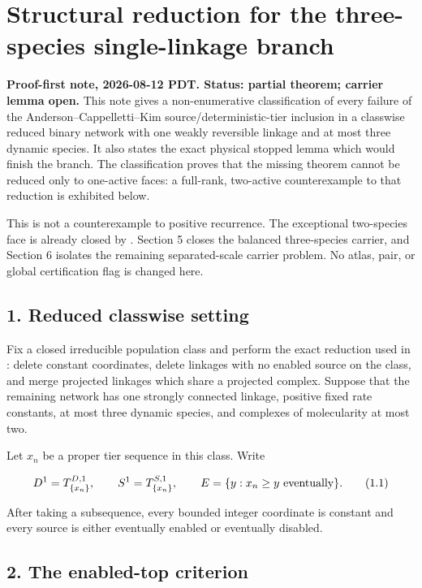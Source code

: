 \section{Structural reduction for the three-species single-linkage
branch}

\textbf{Proof-first note, 2026-08-12 PDT. Status: partial theorem;
carrier lemma open.} This note gives a non-enumerative classification of
every failure of the Anderson--Cappelletti--Kim
source/deterministic-tier inclusion in a classwise reduced binary
network with one weakly reversible linkage and at most three dynamic
species. It also states the exact physical stopped lemma which would
finish the branch. The classification proves that the missing theorem
cannot be reduced only to one-active faces: a full-rank, two-active
counterexample to that reduction is exhibited below.

This is not a counterexample to positive recurrence. The exceptional
two-species face is already closed by
\texttt{}.
Section 5 closes the balanced three-species carrier, and Section 6
isolates the remaining separated-scale carrier problem. No atlas, pair,
or global certification flag is changed here.

\subsection{1. Reduced classwise
setting}

Fix a closed irreducible population class and perform the exact
reduction used in
\texttt{}: delete
constant coordinates, delete linkages with no enabled source on the
class, and merge projected linkages which share a projected complex.
Suppose that the remaining network has one strongly connected linkage,
positive fixed rate constants, at most three dynamic species, and
complexes of molecularity at most two.

Let \(x_n\) be a proper tier sequence in this class. Write

\[
 D^1=T^{D,1}_{\{x_n\}},\qquad
 S^1=T^{S,1}_{\{x_n\}},\qquad
 E=\{y:x_n\ge y\hbox{ eventually}\}.                         \tag{1.1}
\]

After taking a subsequence, every bounded integer coordinate is constant
and every source is either eventually enabled or eventually disabled.

\subsection{2. The enabled-top
criterion}

